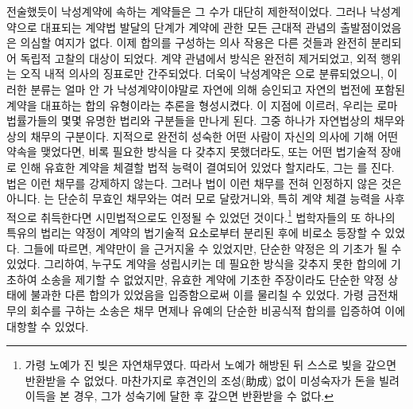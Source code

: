 전술했듯이 낙성계약에 속하는 계약들은 그 수가 대단히 제한적이었다.
그러나
낙성계약으로 대표되는 계약법 발달의 단계가
계약에 관한 모든 근대적 관념의 출발점이었음은 의심할 여지가 없다.
이제 합의를 구성하는 의사 작용은
다른 것들과 완전히 분리되어 독립적 고찰의 대상이 되었다.
계약 관념에서 방식은 완전히 제거되었고,
외적 행위는 오직 내적 의사의 징표로만 간주되었다.
더욱이 낙성계약은 으로 분류되었으니,
이러한 분류는
얼마 안 가
낙성계약이야말로
자연에 의해 승인되고 자연의 법전에 포함된
계약을 대표하는 합의 유형이라는 추론을 형성시켰다.
이 지점에 이르러, 우리는
로마 법률가들의 몇몇 유명한 법리와 구분들을 만나게 된다.
그중 하나가 자연법상의 채무와
상의 채무의 구분이다.
지적으로 완전히 성숙한 어떤 사람이
자신의 의사에 기해
어떤 약속을 맺었다면,
비록 필요한 방식을 다 갖추지 못했더라도,
또는 어떤 법기술적 장애로 인해
유효한 계약을 체결할 법적 능력이 결여되어 있었다 할지라도,
그는 를 진다.
법은
이런 채무를 강제하지 않는다.
그러나 법이 이런 채무를 전혀 인정하지 않은 것은 아니다.
는
단순히 무효인 채무와는 여러 모로 달랐거니와,
특히 계약 체결 능력을 사후적으로 취득한다면
시민법적으로도 인정될 수 있었던 것이다.\footnote{%
  가령 노예가 진 빚은 자연채무였다. 따라서 노예가 해방된 뒤
  스스로 빚을 갚으면 반환받을 수 없었다.
  마찬가지로 후견인의 조성(助成) 없이 미성숙자가 돈을 빌려 이득을 본 경우,
  그가 성숙기에 달한 후 갚으면 반환받을 수 없다.
  }
법학자들의 또 하나의 특유의 법리는 약정이
계약의 법기술적 요소로부터 분리된 후에 비로소 등장할 수 있었다.
그들에 따르면,
계약만이 을 근거지울 수 있었지만,
단순한 약정은 의 기초가 될 수 있었다.
그리하여,
누구도
계약을 성립시키는 데 필요한
방식을 갖추지 못한
합의에 기초하여 소송을 제기할 수 없었지만,
유효한 계약에 기초한 주장이라도
단순한 약정 상태에 불과한 다른 합의가 있었음을 입증함으로써
이를 물리칠 수 있었다.
가령 금전채무의 회수를 구하는 소송은
채무 면제나 유예의
단순한 비공식적 합의를 입증하여 이에 대항할 수 있었다.

